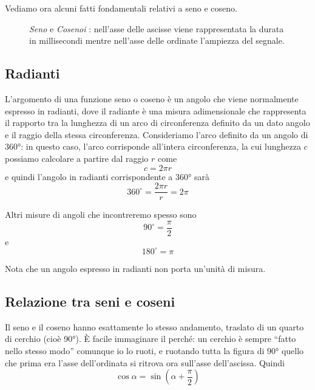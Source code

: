 Vediamo ora alcuni fatti fondamentali relativi a seno e coseno.

\begin{figure}
    \begin{center}
       \scalebox{0.6} {}
    \end{center}
    \caption{\emph{Seno} e \emph{Cosenoi} : nell'asse delle ascisse viene rappresentata la durata in millisecondi mentre nell'asse delle ordinate l'ampiezza del segnale.}
\end{figure}

\subsection{Radianti}

L'argomento di una funzione seno o coseno è un angolo che viene normalmente espresso in radianti, dove il radiante è una misura adimensionale che rappresenta il rapporto tra la lunghezza di un arco di circonferenza definito da un dato angolo e il raggio della stessa circonferenza. Consideriamo l'arco definito da un angolo di 360°: in questo caso, l'arco corrisponde all'intera circonferenza, la cui lunghezza $c$ possiamo calcolare a partire dal raggio $r$ come
\begin{equation}
c = 2 \pi r
\end{equation}
e quindi l'angolo in radianti corrispondente a 360° sarà
\begin{equation}
360^{\circ} = \frac{2 \pi r}{r} = 2 \pi
\end{equation}

Altri misure di angoli che incontreremo spesso sono
\begin{equation}
90^{\circ} = \frac{\pi}{2}
\end{equation}
e
\begin{equation}
180^{\circ} = \pi
\end{equation}

Nota che un angolo espresso in radianti non porta un'unità di misura.


\subsection{Relazione tra seni e coseni}

Il seno e il coseno hanno esattamente lo stesso andamento, traslato di un quarto di cerchio (cioè 90°). È facile immaginare il perché: un cerchio è sempre ``fatto nello stesso modo'' comunque io lo ruoti, e ruotando tutta la figura di 90° quello che prima era l'asse dell'ordinata si ritrova ora sull'asse dell'ascissa. Quindi
\begin{equation}
\cos \alpha = \sin(\alpha + \frac{\pi}{2})
\end{equation}


